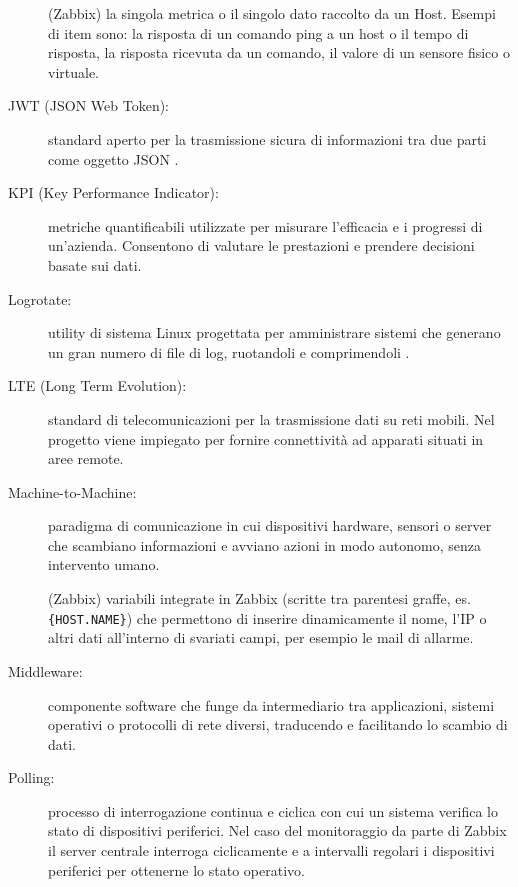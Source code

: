 \documentclass[12pt, a4paper, oneside]{report}
\begin{document}
\begin{description}
    \item[\hypertarget{glo:item}Item:] (Zabbix) la singola metrica o il singolo dato raccolto da un Host. Esempi di item sono: la risposta di un comando ping a un host o il tempo di risposta, la risposta ricevuta da un comando, il valore di un sensore fisico o virtuale.
    \item[JWT (JSON Web Token):] standard aperto per la trasmissione sicura di informazioni tra due parti come oggetto JSON \parencite{JWT}.
    \item[KPI (Key Performance Indicator):] metriche quantificabili utilizzate per misurare l'efficacia e i progressi di un'azienda. Consentono di valutare le prestazioni e prendere decisioni basate sui dati.
    \item[Logrotate:] utility di sistema Linux progettata per amministrare sistemi che generano un gran numero di file di log, ruotandoli e comprimendoli \parencite{man_logrotate}.
    \item[LTE (Long Term Evolution):] standard di telecomunicazioni per la trasmissione dati su reti mobili. Nel progetto viene impiegato per fornire connettività ad apparati situati in aree remote.
    \item[Machine-to-Machine:] paradigma di comunicazione in cui dispositivi hardware, sensori o server che scambiano informazioni e avviano azioni in modo autonomo, senza intervento umano.
    \item[\hypertarget{glo:macro}Macro:] (Zabbix) variabili integrate in Zabbix (scritte tra parentesi graffe, es. \\\texttt{\{HOST.NAME\}}) che permettono di inserire dinamicamente il nome, l'IP o altri dati all'interno di svariati campi, per esempio le mail di allarme.
    \item[Middleware:] componente software che funge da intermediario tra applicazioni, sistemi operativi o protocolli di rete diversi, traducendo e facilitando lo scambio di dati.
    \item[Polling:] processo di interrogazione continua e ciclica con cui un sistema verifica lo stato di dispositivi periferici. Nel caso del monitoraggio da parte di Zabbix il server centrale interroga ciclicamente e a intervalli regolari i dispositivi periferici per ottenerne lo stato operativo.

\end{description}
\end{document}

